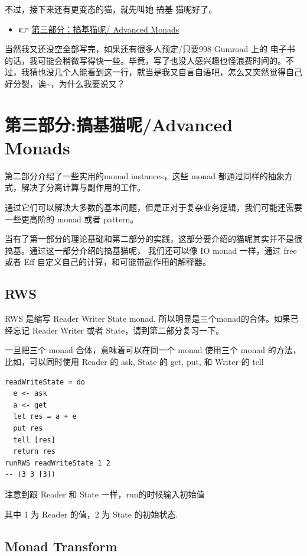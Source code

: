 \documentclass[11pt]{tufte-book}
\begin{document}
不过，接下来还有更变态的猫，就先叫她 \sout{搞基} 猫呢好了。

\begin{itemize}
\item 👉 \href{./part3.org}{第三部分：搞基猫呢/ Advanced Monads}
\end{itemize}

当然我又还没空全部写完，如果还有很多人预定/只要998 Gumroad 上的  电子书的话，我可能会稍微写得快一些。毕竟，写了也没人感兴趣也怪浪费时间的。不过，我猜也没几个人能看到这一行，就当是我又自言自语吧，怎么又突然觉得自己好分裂，诶\textasciitilde{}，为什么我要说又？

\part{第三部分:搞基猫呢/Advanced Monads}
\label{sec:org55db55f}
第二部分介绍了一些实用的monad instances，这些 monad 都通过同样的抽象方式，解决了分离计算与副作用的工作。

通过它们可以解决大多数的基本问题，但是正对于复杂业务逻辑，我们可能还需要一些更高阶的 monad 或者 pattern。

当有了第一部分的理论基础和第二部分的实践，这部分要介绍的猫呢其实并不是很搞基。通过这一部分介绍的搞基猫呢，
我们还可以像 IO monad 一样，通过 free 或者 Eff 自定义自己的计算，和可能带副作用的解释器。

\chapter{RWS}
\label{sec:org520a90d}
RWS 是缩写 Reader Writer State monad, 所以明显是三个monad的合体。如果已经忘记 Reader Writer 或者 State，请到第二部分复习一下。

一旦把三个 monad 合体，意味着可以在同一个 monad 使用三个 monad 的方法，比如，可以同时使用 Reader 的 ask, State 的 get, put, 和 Writer 的 tell

\begin{verbatim}
readWriteState = do
  e <- ask
  a <- get
  let res = a + e
  put res
  tell [res]
  return res
runRWS readWriteState 1 2
-- (3 3 [3])
\end{verbatim}

注意到跟 Reader 和 State 一样，run的时候输入初始值

其中 1 为 Reader 的值，2 为 State 的初始状态.

\chapter{Monad Transform}
\label{sec:org560c7f7}
\end{document}
